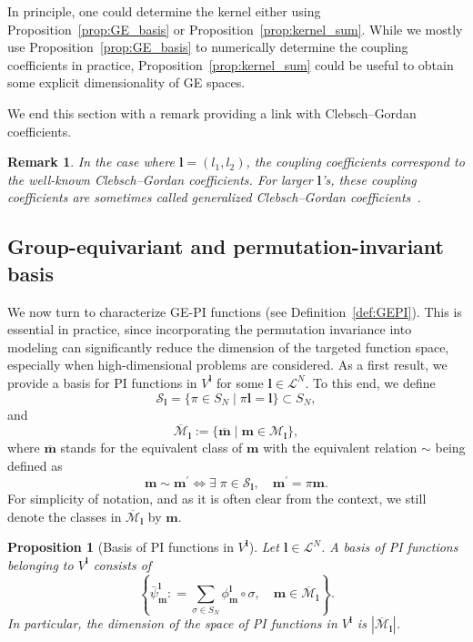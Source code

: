 \documentclass{article}
\newcommand{\bpsi}[2]{\bar\psi^{#1}_{#2}}
\newcommand{\card}[1]{|{#1}|}
\newtheorem{proposition}[theorem]{Proposition}
\newtheorem{remark}[theorem]{Remark}
\numberwithin{equation}{section}
\def\bl{{\bm l}}
\def\bbm{{\bm m}}
\def\calM{\mathcal{M}}
\def\calL{\mathcal{L}}
\def\calS{\mathcal{S}}
\def\oMl{\overline{\calM}_\bl}
\def\Nat{{N}}
\begin{document}
In principle, one could determine the kernel either using Proposition~\ref{prop:GE_basis}
or Proposition~\ref{prop:kernel_sum}. While we mostly use Proposition~\ref{prop:GE_basis} to numerically determine the coupling coefficients in practice, Proposition~\ref{prop:kernel_sum} could be useful to obtain some explicit dimensionality of GE spaces.

We end this section with a remark providing a link with Clebsch--Gordan coefficients.

\begin{remark}
\label{rem:CG}
    In the case where $\bl = (l_1,l_2)$, the coupling coefficients correspond to the well-known Clebsch--Gordan coefficients. For larger $\bl$'s, these coupling coefficients are sometimes called generalized Clebsch--Gordan coefficients~\cite{Dusson2022-ie,Batatia2023-us}. 
\end{remark}


\subsection{Group-equivariant and permutation-invariant basis}\label{sec:ge-pi}

We now turn to characterize GE-PI functions (see Definition~\ref{def:GEPI}).
This is essential in practice, since incorporating the permutation invariance into modeling can significantly reduce the dimension of the targeted function space, especially when high-dimensional problems are considered. 
As a first result, we provide a basis for PI functions in $V^\bl$ for some $\bl \in \calL^\Nat$.
To this end, we define
\[
    \calS_{\bl}=\{\pi \in S_\Nat \; | \;
    \pi\bl=\bl\}\subset S_\Nat,
\]
and 
\begin{equation}\label{eq:GE_class}
    \oMl:=\{\overline{\bbm}\;|\;\bbm\in \calM_{\bl}\},
\end{equation}
where $\overline{\bbm}$ stands for the equivalent class of $\bbm$ with the equivalent relation $\sim$ being defined as 
\[
    \bbm\sim\bbm^{\prime}  \Leftrightarrow \exists \; \pi\in \calS_{\bl}, \quad \bbm^{\prime}=\pi\bbm.
\]
For simplicity of notation, and as it is often clear from the context, we still denote the classes in $\oMl$ by $\bbm$. 
\begin{proposition}[Basis of PI functions in $V^\bl$]\label{prop:basis-pi}
    Let $\bl\in\calL^\Nat$. 
    A basis of PI functions belonging to $V^{\bl}$ consists of 
\begin{equation}
\label{eq:PI_Nbody}
        \left\{ \displaystyle\bpsi{\bl}{\bbm}: =\sum_{\sigma\in S_\Nat}\phi^\bl_\bbm\circ\sigma, \quad \bbm\in \oMl \right\}.
\end{equation}
In particular, the dimension of the space of PI functions in $V^\bl$ is $\card{\oMl}$.
\end{proposition}
\end{document}
